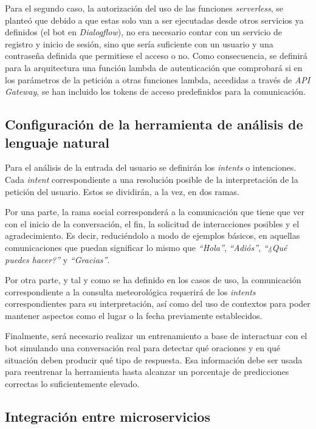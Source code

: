 \documentclass[11pt,spanish,listoffigures]{tfgetsinf}
\begin{document}
Para el segundo caso, la autorización del uso de las funciones \textit{serverless}, se planteó que debido a que estas solo van a ser ejecutadas desde otros servicios ya definidos (el bot en \textit{Dialogflow}), no era necesario contar con un servicio de registro y inicio de sesión, sino que sería suficiente con un usuario y una contraseña definida que permitiese el acceso o no. Como consecuencia, se definirá para la arquitectura una función lambda de autenticación que comprobará si en los parámetros de la petición a otras funciones lambda, accedidas a través de \textit{API Gateway}, se han incluido los tokens de acceso predefinidos para la comunicación.

\subsection{Configuración de la herramienta de análisis de lenguaje natural}
\label{subsec:configuracion-haln}

Para el análisis de la entrada del usuario se definirán los \textit{intents} o intenciones. Cada \textit{intent} correspondiente a una resolución posible de la interpretación de la petición del usuario. Estos se dividirán, a la vez, en dos ramas.

Por una parte, la rama social corresponderá a la comunicación que tiene que ver con el inicio de la conversación, el fin, la solicitud de interacciones posibles y el agradecimiento. Es decir, reduciéndolo a modo de ejemplos básicos, en aquellas comunicaciones que puedan significar lo mismo que \textit{“Hola”}, \textit{“Adiós”}, \textit{“¿Qué puedes hacer?”} y \textit{“Gracias”}.

Por otra parte, y tal y como se ha definido en los casos de uso, la comunicación correspondiente a la consulta meteorológica requerirá de los \textit{intents} correspondientes para su interpretación, así como del uso de contextos para poder mantener aspectos como el lugar o la fecha previamente establecidos.

Finalmente, será necesario realizar un entrenamiento a base de interactuar con el bot simulando una conversación real para detectar qué oraciones y en qué situación deben producir qué tipo de respuesta. Esa información debe ser usada para reentrenar la herramienta hasta alcanzar un porcentaje de predicciones correctas lo suficientemente elevado.

\subsection{Integración entre microservicios}
\label{subsec:integracion-microservicios}
\end{document}
